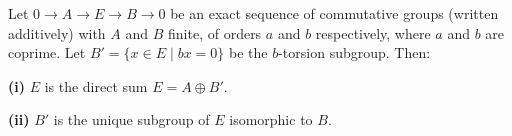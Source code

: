 Let $0 \rightarrow A \rightarrow E \rightarrow B \rightarrow 0$ be an exact sequence of commutative groups (written additively) with $A$ and $B$ finite, of orders $a$ and $b$ respectively, where $a$ and $b$ are coprime. Let $B' = \{x \in E \mid bx = 0\}$ be the $b$-torsion subgroup. Then:

\textbf{(i)} $E$ is the direct sum $E = A \oplus B'$.

\textbf{(ii)} $B'$ is the unique subgroup of $E$ isomorphic to $B$.
